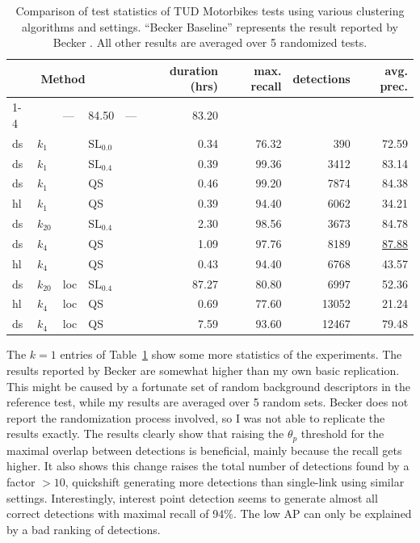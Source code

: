 \begin{table}
    \caption{Comparison of test statistics of TUD Motorbikes tests using various clustering algorithms and settings. ``Becker Baseline'' represents the result reported by Becker \cite{becker2012codebook}. All other results are averaged over 5 randomized tests.}
    \label{tab:tudallstats}
    \begin{tabular}{@{}llllcrrrr@{}}
    \toprule
    \multicolumn{4}{c}{Method}& \phantom{abc} & duration (hrs)&max. recall&detections&avg. prec.\\
    \cmidrule{1-4}
    \cmidrule{6-9}
    \multicolumn{4}{@{}l}{Becker Baseline}&& ---&84.50&---&83.20\\
    ds & $k_1$ & & SL$_{0.0}$&& 0.34&76.32&390&72.59\\
    ds & $k_1$ & & SL$_{0.4}$&& 0.39&99.36&3412&83.14\\
    ds & $k_1$ & & QS && 0.46&99.20&7874&84.38\\
    hl & $k_1$ & & QS && 0.39&94.40&6062&34.21\\
    ds & $k_{20}$ & & SL$_{0.4}$&& 2.30&98.56&3673&84.78\\
    ds & $k_4$ & & QS && 1.09&97.76&8189&\underline{87.88}\\
    hl & $k_4$ & & QS && 0.43&94.40&6768&43.57\\
    ds & $k_{20}$ & loc & SL$_{0.4}$&& 87.27&80.80&6997&52.36\\
    hl & $k_4$ & loc & QS && 0.69&77.60&13052&21.24\\
    ds & $k_4$ & loc & QS && 7.59&93.60&12467&79.48\\
    \bottomrule
\end{tabular}

\end{table}

The $k=1$ entries of Table~\ref{tab:tudallstats} show some more statistics of the experiments. The results reported by Becker are somewhat higher than my own basic replication. This might be caused by a fortunate set of random background descriptors in the reference test, while my results are averaged over 5 random sets. Becker does not report the randomization process involved, so I was not able to replicate the results exactly. The results clearly show that raising the $\theta_p$ threshold for the maximal overlap between detections is beneficial, mainly because the recall gets higher. It also shows this change raises the total number of detections found by a factor $>10$, quickshift generating more detections than single-link using similar settings. Interestingly, interest point detection seems to generate almost all correct detections with maximal recall of 94\%. The low AP can only be explained by a bad ranking of detections.

